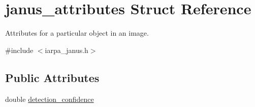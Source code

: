 \hypertarget{structjanus__attributes}{}\section{janus\+\_\+attributes Struct Reference}
\label{structjanus__attributes}


Attributes for a particular object in an image.  




{\ttfamily \#include $<$iarpa\+\_\+janus.\+h$>$}

\subsection*{Public Attributes}
\begin{DoxyCompactItemize}
\item 
\hypertarget{structjanus__attributes_abf95dbc8d5711e30b04a67c32ba478aa}{}double \hyperlink{structjanus__attributes_abf95dbc8d5711e30b04a67c32ba478aa}{detection\+\_\+confidence}\label{structjanus__attributes_abf95dbc8d5711e30b04a67c32ba478aa}


\end{DoxyCompactItemize}
